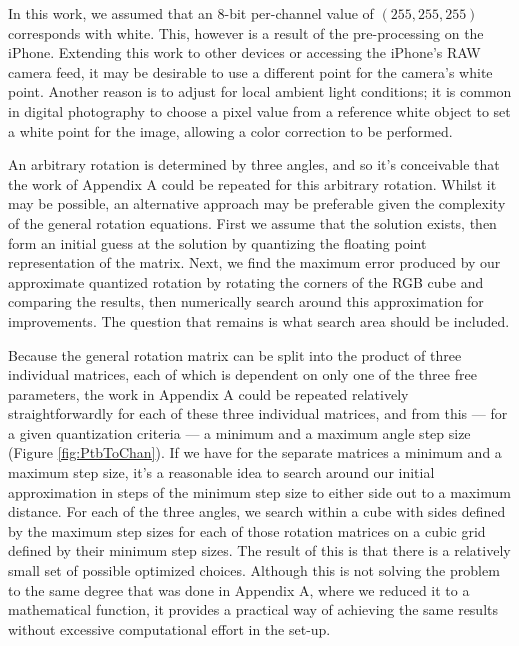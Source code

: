 In this work, we assumed that an 8-bit per-channel value of $(255, 255, 255)$ corresponds with white. This, however is a result of the pre-processing on the iPhone. Extending this work to other devices or accessing the iPhone's RAW camera feed, it may be desirable to use a different point for the camera's white point. Another reason is to adjust for local ambient light conditions; it is common in digital photography to choose a pixel value from a reference white object to set a white point for the image, allowing a color correction to be performed.

An arbitrary rotation is determined by three angles, and so it's conceivable that the work of Appendix A could be repeated for this arbitrary rotation. Whilst it may be possible, an alternative approach may be preferable given the complexity of the general rotation equations. First we assume that the solution exists, then form an initial guess at the solution by quantizing the floating point representation of the matrix. Next, we find the maximum error produced by our approximate quantized rotation by rotating the corners of the RGB cube and comparing the results, then numerically search around this approximation for improvements. The question that remains is what search area should be included.

Because the general rotation matrix can be split into the product of three individual matrices, each of which is dependent on only one of the three free parameters, the work in Appendix A could be repeated relatively straightforwardly for each of these three individual matrices, and from this --- for a given quantization criteria --- a minimum and a maximum angle step size (Figure \ref{fig:PtbToChan}). If we have for the separate matrices a minimum and a maximum step size, it's a reasonable idea to search around our initial approximation in steps of the minimum step size to either side out to a maximum distance. For each of the three angles, we search within a cube with sides defined by the maximum step sizes for each of those rotation matrices on a cubic grid defined by their minimum step sizes. The result of this is that there is a relatively small set of possible optimized choices. Although this is not solving the problem to the same degree that was done in Appendix A, where we reduced it to a mathematical function, it provides a practical way of achieving the same results without excessive computational effort in the set-up. 

